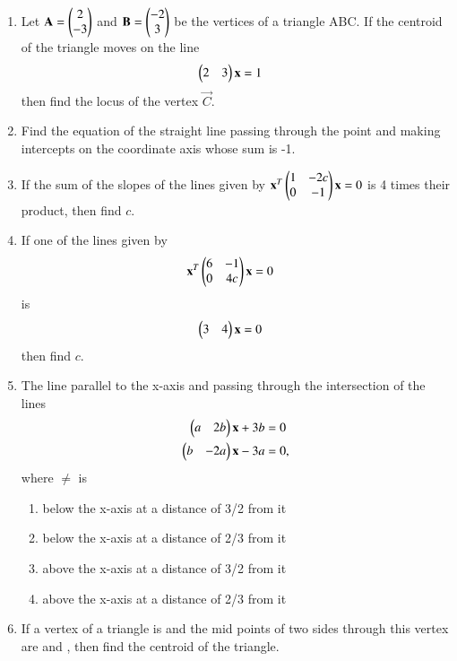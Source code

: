 \begin{enumerate}[label=\arabic*.,ref=\thesubsection.\theenumi]
    \item Let $\mathbf{A}=\begin{pmatrix}2\\-3\end{pmatrix}$ and $\mathbf{B}=\begin{pmatrix}-2\\3\end{pmatrix}$ be the vertices of a triangle ABC. If the centroid of the triangle moves on the line \begin{align}\begin{pmatrix}2 & 3\end{pmatrix}\mathbf {x} &= 1 \end{align} then find the locus of the vertex $\vec{C}$.
    \item Find the equation of the straight line passing through the point  and making intercepts on the coordinate axis whose sum is -1.
    \item If the sum of the slopes of the lines given by $\mathbf {x}^T \begin{pmatrix}1 & -2c \\ 0 & -1\end{pmatrix} \mathbf {x} = 0$ is 4 times their product, then find  $c$.
    \item If one of the lines given by \begin{align}\mathbf {x}^T \begin{pmatrix}6 & -1 \\ 0 & 4c\end{pmatrix} \mathbf {x} &= 0\end{align} is \begin{align}\begin{pmatrix} 3 & 4\end{pmatrix} \mathbf {x} &= 0\end{align} then find $c$.
    \item The line parallel to the x-axis and passing through the intersection of the lines \begin{align}\begin{pmatrix}a & 2b\end{pmatrix} \mathbf {x} + 3b &= 0 \\ \begin{pmatrix}b & -2a\end{pmatrix} \mathbf {x} - 3a &= 0, \end{align} where $\neq$ is
    \begin{enumerate}
     \item  below the x-axis at a distance of 3/2 from it
     \item  below the x-axis at a distance of 2/3 from it
     \item  above the x-axis at a distance of 3/2 from it
     \item  above the x-axis at a distance of 2/3 from it
     \end{enumerate}
    \item If a vertex of a triangle is  and the mid points of two sides through this vertex are  and , then find the centroid of the triangle.

\end{enumerate}
